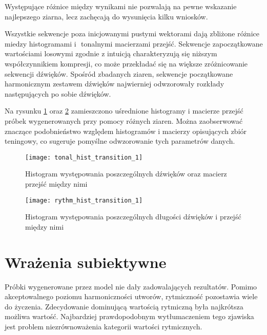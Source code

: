 {{        Występujące różnice między wynikami nie pozwalają na pewne wskazanie najlepszego ziarna, lecz 
        zachęcają do wysunięcia kilku wniosków.

        Wszystkie sekwencje poza inicjowanymi pustymi wektorami dają zbliżone różnice miedzy histogramami i\,\,
        tonalnymi macierzami przejść. 
        Sekwencje zapoczątkowane wartościami losowymi zgodnie z\,\,intuicją charakteryzują się niższym współczynnikiem
        kompresji, co może przekładać się na większe zróżnicowanie sekwencji dźwięków.
        Spośród zbadanych ziaren, sekwencje początkowane harmonicznym zestawem dźwięków najwierniej
        odwzorowały rozkłady następujących po sobie dźwięków.

        \bigskip
        
        Na rysunku \ref{tonal_hist_transition_1} oraz \ref{rythm_hist_transition_1} zamieszczono uśrednione 
        histogramy i\,\,macierze przejść próbek wygenerowanych przy pomocy różnych ziaren. 
        Można zaobserwować znaczące podobnieństwo względem histogramów i macierzy opisujących zbiór teningowy, co sugeruje pomyślne odwzorowanie tych parametrów danych.

        \begin{figure}
            \centering
            \texttt{[image: tonal\_hist\_transition\_1]}
            \caption{Histogram występowania poszczególnych dźwięków oraz macierz przejść między nimi}
            \label{tonal_hist_transition_1}
        \end{figure}

        \begin{figure}
            \centering
            \texttt{[image: rythm\_hist\_transition\_1]}
            \caption{Histogram występowania poszczególnych długości dźwięków i\,\,przejść między nimi}
            \label{rythm_hist_transition_1}
        \end{figure}
    }

    \section{Wrażenia subiektywne}
    {
        Próbki wygenerowane przez model nie dały zadowalających rezultatów. Pomimo akceptowalnego poziomu 
        harmoniczności utworów, rytmiczność pozostawia wiele do życzenia. Zdecydowanie dominującą wartością 
        rytmiczną była najkrótsza możliwa wartość. Najbardziej prawdopodobnym wytłumaczeniem tego zjawiska jest 
        problem niezrównoważenia kategorii wartości rytmicznych. 

}}
